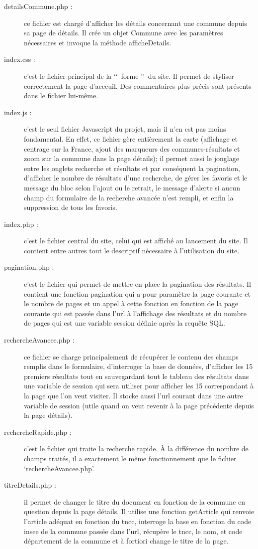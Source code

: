 \documentclass{report}
\begin{document}
\begin{description}
\item[detailsCommune.php :] ce fichier est chargé d'afficher les détails concernant une commune depuis sa page de détails. Il crée un objet Commune avec les paramètres nécessaires et invoque la méthode afficheDetails.
\item[index.css :] c'est le fichier principal de la \lq\lq\ forme \rq\rq\ du site. Il permet de styliser correctement la page d'acceuil. Des commentaires plus précis sont présents dans le fichier lui-même.
\item[index.js :] c'est le seul fichier Javascript du projet, mais il n'en est pas moins fondamental. En effet, ce fichier gère entièrement la carte (affichage et centrage sur la France, ajout des marqueurs des communes-résultats et zoom sur la commune dans la page détails); il permet aussi le jonglage entre les onglets recherche et résultats et par conséquent la pagination, d'afficher le nombre de résultats d'une recherche, de gérer les favoris et le message du bloc selon l'ajout ou le retrait, le message d'alerte si aucun champ du formulaire de la recherche avancée n'est rempli, et enfin la suppression de tous les favoris.
\item[index.php :] c'est le fichier central du site, celui qui est affiché au lancement du site. Il contient entre autres tout le descriptif nécessaire à l'utilisation du site.
\item[pagination.php :] c'est le fichier qui permet de mettre en place la pagination des résultats. Il contient une fonction pagination qui a pour paramètre la page courante et le nombre de pages et un appel à cette fonction en fonction de la page courante qui est passée dans l'url à l'affichage des résultats et du nombre de pages qui est une variable session définie après la requête SQL.
\item[rechercheAvancee.php :] ce fichier se charge principalement de récupérer le contenu des champs remplis dans le formulaire, d'interroger la base de données, d'afficher les 15 premiers résultats tout en sauvegardant tout le tableau des résultats dans une variable de session qui sera utiliser pour afficher les 15 correspondant à la page que l'on veut visiter. Il stocke aussi l'url courant dans une autre variable de session (utile quand on veut revenir à la page précédente depuis la page détails).
\item[rechercheRapide.php :] c'est le fichier qui traite la recherche rapide. À la différence du nombre de champs traités, il a exactement le même fonctionnement que le fichier \lq rechercheAvancee.php\rq.
\item[titreDetails.php :] il permet de changer le titre du document en fonction de la commune en question depuis la page détails. Il utilise une fonction getArticle qui renvoie l'article adéquat en fonction du tncc, interroge la base en fonction du code insee de la commune passée dans l'url, récupère le tncc, le nom, et code département de la commune et à fortiori change le titre de la page.
\end{description}
\end{document}
